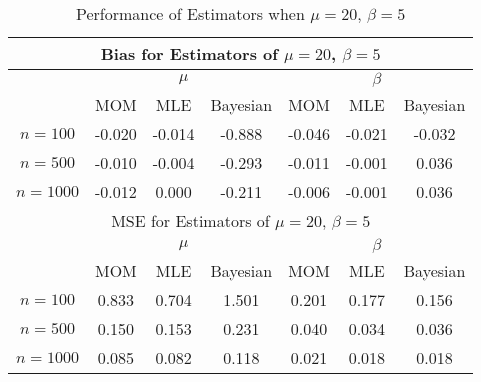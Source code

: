 \documentclass{svproc}
\begin{document}
\begin{table}[H]
\begin{center}
\caption{Performance of Estimators when $\mu = 20$, $\beta = 5$}
\begin{tabular}{|c|c|c|c|c|c|c|}
\hline
\multicolumn{7}{|c|}{Bias for Estimators of $\mu = 20$, $\beta = 5$}\\
\hline
  &\multicolumn{3}{|c|}{$\mu$} &\multicolumn{3}{|c|}{$\beta$}\\
\hline
 & MOM & MLE & Bayesian & MOM & MLE & Bayesian \\
\hline
$n = 100$ & -0.020 & -0.014 & -0.888 & -0.046 & -0.021 & -0.032\\
\hline
$n = 500$ & -0.010 & -0.004 & -0.293 & -0.011 & -0.001 & 0.036\\
\hline
$n = 1000$ & -0.012 & 0.000 & -0.211 & -0.006 & -0.001 & 0.036\\
\hline
\hline
\multicolumn{7}{|c|}{MSE for Estimators of $\mu = 20$, $\beta = 5$}\\
\hline
  &\multicolumn{3}{|c|}{$\mu$} &\multicolumn{3}{|c|}{$\beta$}\\
\hline
 & MOM & MLE & Bayesian & MOM & MLE & Bayesian \\
\hline
$n = 100$ & 0.833 & 0.704 & 1.501 & 0.201 & 0.177 & 0.156\\
\hline
$n = 500$ & 0.150 & 0.153 & 0.231 & 0.040 & 0.034 & 0.036\\
\hline
$n = 1000$ & 0.085 & 0.082 & 0.118 & 0.021 & 0.018 & 0.018\\
\hline
\end{tabular}
\medskip
\label{tab4}
\end{center}
\end{table}
\end{document}
